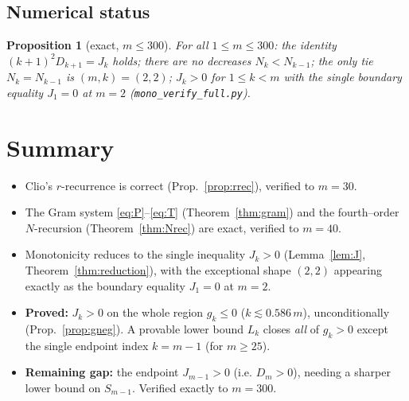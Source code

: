 \documentclass[11pt]{article}
\newtheorem{proposition}{Proposition}
\theoremstyle{definition}
\begin{document}
\subsection{Numerical status}

\begin{proposition}[exact, $m\le300$]\label{prop:numeric}
For all $1\le m\le300$: the identity $(k+1)^2D_{k+1}=J_k$ holds; there are
\emph{no} decreases $N_k<N_{k-1}$; the only tie $N_k=N_{k-1}$ is $(m,k)=(2,2)$;
$J_k>0$ for $1\le k<m$ with the single boundary equality $J_1=0$ at $m=2$
(\texttt{mono\_verify\_full.py}).
\end{proposition}

\section{Summary}
\begin{itemize}
\item Clio's $r$-recurrence is correct (Prop.~\ref{prop:rrec}), verified to
$m=30$.
\item The Gram system \eqref{eq:P}--\eqref{eq:T} (Theorem~\ref{thm:gram}) and the
fourth--order $N$-recursion (Theorem~\ref{thm:Nrec}) are exact, verified to
$m=40$.
\item Monotonicity reduces to the single inequality $J_k>0$
(Lemma~\ref{lem:J}, Theorem~\ref{thm:reduction}), with the exceptional shape
$(2,2)$ appearing exactly as the boundary equality $J_1=0$ at $m=2$.
\item \textbf{Proved:} $J_k>0$ on the whole region $g_k\le0$
($k\lesssim0.586\,m$), unconditionally (Prop.~\ref{prop:gneg}). A provable lower
bound $L_k$ closes \emph{all} of $g_k>0$ except the single endpoint index
$k=m-1$ (for $m\ge25$).
\item \textbf{Remaining gap:} the endpoint $J_{m-1}>0$ (i.e. $D_m>0$), needing a
sharper lower bound on $S_{m-1}$. Verified exactly to $m=300$.
\end{itemize}
\end{document}
